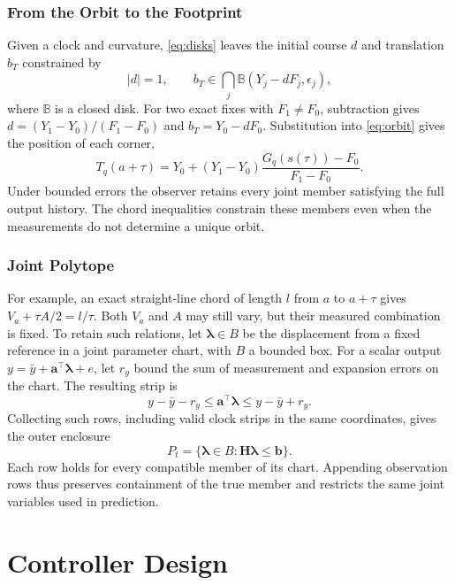 \documentclass[journal]{IEEEtran}
\theoremstyle{definition}
\newcommand{\vct}[1]{\boldsymbol{#1}}
\newcommand{\mtx}[1]{\mathbf{#1}}
\begin{document}
\subsubsection{From the Orbit to the Footprint}
Given a clock and curvature, \eqref{eq:disks} leaves the initial course
$d$ and translation $b_T$ constrained by
\begin{equation*}
 |d|=1,\qquad b_T\in\bigcap_j\mathbb B(Y_j-dF_j,\epsilon_j),
\end{equation*}
where $\mathbb B$ is a closed disk. For two exact fixes with $F_1\ne F_0$,
subtraction gives $d=(Y_1-Y_0)/(F_1-F_0)$ and $b_T=Y_0-dF_0$.
Substitution into \eqref{eq:orbit} gives the position of each corner,
\begin{equation}\label{eq:chord}
 T_q(a+\tau)=Y_0+(Y_1-Y_0)\frac{G_q(s(\tau))-F_0}{F_1-F_0}.
\end{equation}
Under bounded errors the observer retains every joint member satisfying
the full output history. The chord inequalities constrain these members
even when the measurements do not determine a unique orbit.

\subsubsection{Joint Polytope}
For example, an exact straight-line chord of length $l$ from $a$ to
$a+\tau$ gives $V_a+\tau A/2=l/\tau$. Both $V_a$ and $A$ may still
vary, but their measured combination is fixed. To retain such
relations, let $\vct\lambda\in B$ be the displacement from a fixed reference in
a joint parameter chart, with $B$ a bounded box. For a scalar output
$y=\bar y+\vct a^\top\vct\lambda+e$, let $r_y$ bound the sum of
measurement and expansion errors on the chart. The resulting strip is
\begin{equation*}
 y-\bar y-r_y\le \vct a^\top\vct\lambda\le y-\bar y+r_y .
\end{equation*}
Collecting such rows, including valid clock strips in the same
coordinates, gives the outer enclosure
\begin{equation}\label{eq:polytope}
 P_t=\{\vct\lambda\in B:\mtx H\vct\lambda\le\vct b\}.
\end{equation}
Each row holds for every compatible member of its chart. Appending
observation rows thus preserves containment of the true member and
restricts the same joint variables used in prediction.

\section{Controller Design}\label{sec:control}
\end{document}
